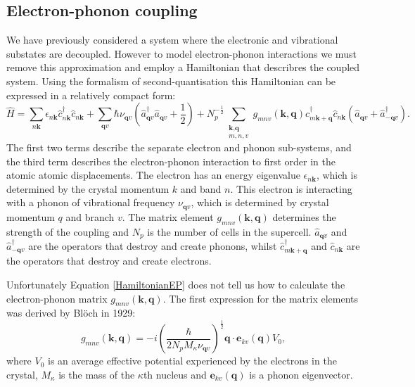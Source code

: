\subsection{Electron-phonon coupling}
We have previously considered a system where the electronic and vibrational substates are decoupled. %
However to model electron-phonon interactions we must remove this approximation and employ a Hamiltonian that describres the coupled system. Using the formalism of second-quantisation this Hamiltonian can be expressed in a relatively compact form:\autocite{Giustino2017}
\begin{equation} \label{HamiltonianEP}
    \hat{H} = \sum_{n\textbf{k}}\epsilon_{n\textbf{k}}\hat{c}^{\dagger}_{n\textbf{k}}\hat{c}_{n\textbf{k}} + \sum_{\textbf{q}v}\hbar\nu_{\textbf{q}v}(\hat{a}^{\dagger}_{\textbf{q}v}\hat{a}_{\textbf{q}v}+\frac{1}{2})+N_p^{-\frac{1}{2}}\sum_{\substack{\textbf{k},\textbf{q} \\ m,n,v}}g_{mnv}(\textbf{k},\textbf{q})\hat{c}^{\dagger}_{m\textbf{k}+\textbf{q}}\hat{c}_{n\textbf{k}}(\hat{a}_{\textbf{q}v}+\hat{a}^{\dagger}_{-\textbf{q}v}).
\end{equation}
The first two terms describe the separate electron and phonon sub-systems, and the third term describes the electron-phonon interaction to first order in the atomic atomic displacements. The electron has an energy eigenvalue $\epsilon_{n\textbf{k}}$, which is determined by the crystal momentum $k$ and band $n$. This electron is interacting with a phonon of vibrational frequency $\nu_{\textbf{q}v}$, which is determined by crystal momentum $q$ and branch $v$. The matrix element $g_{mnv}(\textbf{k},\textbf{q})$ determines the strength of the coupling and $N_p$ is the number of cells in the supercell. $\hat{a}_{\textbf{q}v}$ and $\hat{a}^{\dagger}_{-\textbf{q}v}$ are the operators that destroy and create phonons, whilst $\hat{c}^{\dagger}_{m\textbf{k}+\textbf{q}}$ and $\hat{c}_{n\textbf{k}}$ are the operators that destroy and create electrons.

Unfortunately Equation \ref{HamiltonianEP} does not tell us how to calculate the electron-phonon matrix $g_{mnv}(\textbf{k},\textbf{q})$. The first expression for the matrix elements was derived by Bl\"{o}ch in 1929:\autocite{Giustino2017}
\begin{equation}
g_{mnv}(\textbf{k},\textbf{q}) = -i\left(\frac{\hbar}{2N_pM_\kappa\nu_{\textbf{q}v}}\right)^{\frac{1}{2}}\textbf{q}\cdot\textbf{e}_{kv}(\textbf{q})V_0,
\end{equation}
where $V_0$ is an average effective potential experienced by the electrons in the crystal, $M_\kappa$ is the mass of the $\kappa$th nucleus and $\textbf{e}_{kv}(\textbf{q})$ is a phonon eigenvector.

